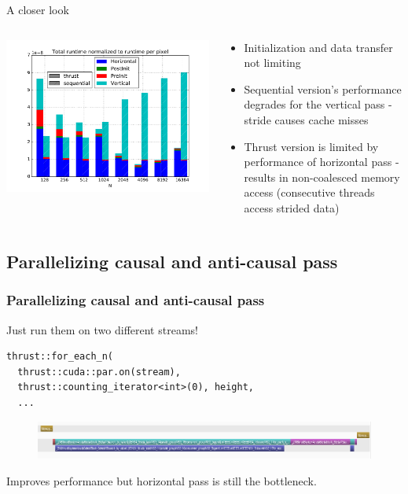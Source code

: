 \documentclass{beamer}
\begin{document}
\begin{frame}{A closer look}
  \begin{columns}
    \begin{column}{7cm}
      \includegraphics[scale=0.4]{imgs/thrust_vs_sequential_normalized.pdf} 
    \end{column}
    \begin{column}{5cm}
      \begin{itemize}
        \item Initialization and data transfer not limiting
        \item Sequential version's performance degrades for the vertical
          pass - stride causes cache misses
        \item Thrust version is limited by performance of horizontal pass -
          results in non-coalesced memory access (consecutive threads access
          strided data)
      \end{itemize}
    \end{column}
  \end{columns}
\end{frame} 

\subsection{Parallelizing causal and anti-causal pass}
\begin{frame}[fragile]
\frametitle{Parallelizing causal and anti-causal pass}
Just run them on two different streams!
  \begin{lstlisting}[basicstyle=\tiny]
thrust::for_each_n(
  thrust::cuda::par.on(stream),
  thrust::counting_iterator<int>(0), height,
  ...
  \end{lstlisting}
  \begin{figure}
      \includegraphics[scale=0.3]{imgs/overlap.png} 
  \end{figure}
  Improves performance but horizontal pass is still the bottleneck.
\end{frame}
\end{document}

